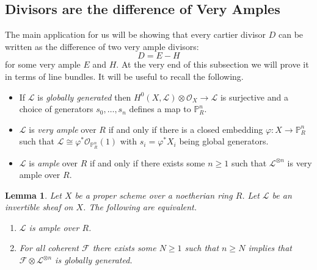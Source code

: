 \documentclass[12pt]{article}
\numberwithin{equation}{section}
\newtheorem{lemma}[theorem]{Lemma}
\theoremstyle{definition}
\theoremstyle{remark}
\newcommand{\Ocal}{\mathcal{O}}
\newcommand{\PP}{\mathbb{P}}
\newcommand{\Lcal}{\mathcal{L}}
\newcommand{\Fcal}{\mathcal{F}}
\begin{document}
\subsection{Divisors are the difference of Very Amples}\label{sec:serre-vanishing-applications}

The main application for us will be showing that every cartier divisor $D$ can be written as the difference of two very ample divisors: 
$$ D = E-H $$
for some very ample $E$ and $H$. 
At the very end of this subsection we will prove it in terms of line bundles. 
It will be useful to recall the following. 
\begin{itemize}
	\item  If $\Lcal$ is \emph{globally generated} then $H^0(X,\Lcal)\otimes \Ocal_X \to \Lcal$ is surjective and a choice of generators $s_0,\ldots,s_n$ defines a map to $\PP^n_R$. 
	\item $\Lcal$ is \emph{very ample} over $R$ if and only if there is a closed embedding $\varphi: X\to \PP^n_R$ such that $\Lcal\cong\varphi^*\Ocal_{\PP^n_R}(1)$ with $s_i = \varphi^*X_i$ being global generators. 
	\item $\Lcal$ is \emph{ample} over $R$ if and only if there exists some $n \geq 1$ such that $\Lcal^{\otimes n}$ is very ample over $R$. 
\end{itemize}

\begin{lemma}\label{lem:equivalent-conditions}
	Let $X$ be a proper scheme over a noetherian ring $R$.
	Let $\Lcal$ be an invertible sheaf on $X$. 
	The following are equivalent.
	\begin{enumerate}
		\item $\Lcal$ is ample over $R$.
		\item For all coherent $\Fcal$ there exists some $N\geq 1$ such that $n\geq N$ implies that $\Fcal \otimes \Lcal^{\otimes n}$ is globally generated.
	\end{enumerate}
\end{lemma}

\end{document}

